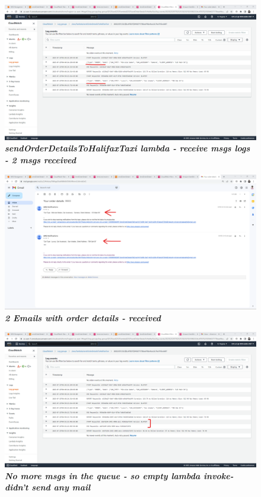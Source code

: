     \begin{figure}[htp]
        \centering
        \includegraphics[scale=1, width=15cm]{PROBLEM 3/Screenshots/5.2 sendOrderDetailsToHalifaxTaxi lambda - receive msgs logs - 2 msgs received.png}
        \caption{\textbf{\textit{sendOrderDetailsToHalifaxTaxi lambda - receive msgs logs - 2 msgs received}}}
        \label{fig:}
    \end{figure}

    \begin{figure}[htp]
        \centering
        \includegraphics[scale=1, width=15cm]{PROBLEM 3/Screenshots/6.1 2 emails received.png}
        \caption{\textbf{\textit{2 Emails with order details - received}}}
        \label{fig:}
    \end{figure}

    \begin{figure}[htp]
        \centering
        \includegraphics[scale=1, width=15cm]{PROBLEM 3/Screenshots/7.1 No more msgs in queue - so empty - didnt send any mail.png}
        \caption{\textbf{\textit{No more msgs in the queue - so empty lambda invoke- didn't send any mail }}}
        \label{fig:}
    \end{figure}
    
    
    
